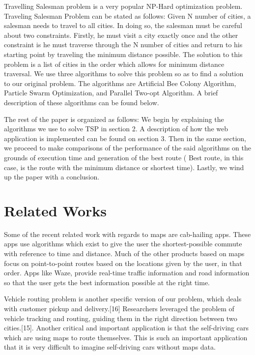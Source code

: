 \documentclass[conference]{IEEEtran}
\begin{document}
Travelling Salesman problem is a very popular NP-Hard optimization problem. Traveling Salesman Problem can be stated as follows: Given N number of cities, a salesman needs to travel to all cities. In doing so, the salesman must be careful about two constraints. Firstly, he must visit a city exactly once and the other constraint is he must traverse through the N number of cities and return to his starting point by traveling the minimum distance possible. The solution to this problem is a list of cities in the order which allows for minimum distance traversal. We use three algorithms to solve this problem so as to find a solution to our original problem. The algorithms are Artificial Bee Colony Algorithm, Particle Swarm Optimization, and Parallel Two-opt Algorithm. A brief description of these algorithms can be found below.


The rest of the paper is organized as follows: We begin by explaining the algorithms we use to solve TSP in section 2. A description of how the web application is implemented can be found on section 3. Then in the same section, we proceed to make comparisons of the performance of the said algorithms on the grounds of execution time and generation of the best route ( Best route, in this case, is the route with the minimum distance or shortest time). Lastly, we wind up the paper with a conclusion.

\section {Related Works}
Some of the recent related work with regards to maps are cab-hailing apps. These apps use algorithms which exist to give the user the shortest-possible commute with reference to time and distance. Much of the other products based on maps focus on point-to-point routes based on the locations given by the user, in that order. Apps like Waze, provide real-time traffic information and road information so that the user gets the best information possible at the right time.

Vehicle routing problem is another specific version of our problem, which deals with customer pickup and delivery.[16] Researchers leveraged the problem of vehicle tracking and routing, guiding them in the right direction between two cities.[15]. Another critical and important application is that the self-driving cars which are using maps to route themselves. This is such an important application that it is very difficult to imagine self-driving cars without maps data.
\end{document}
